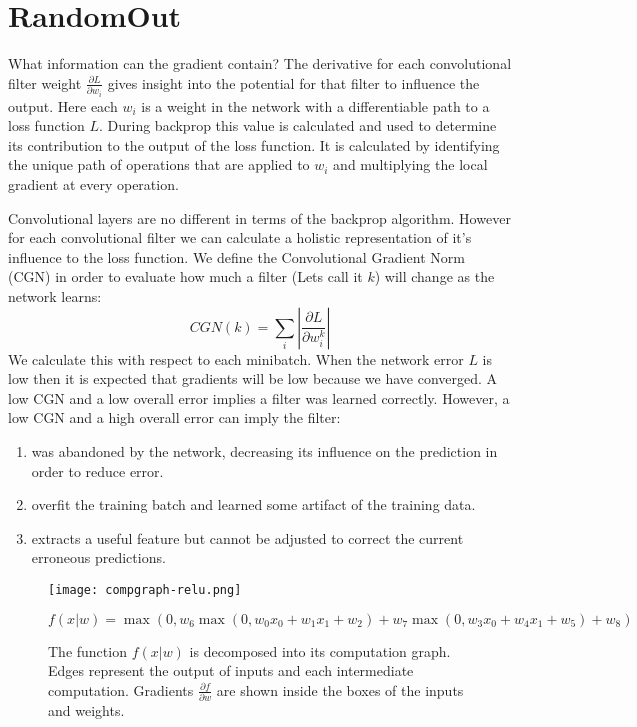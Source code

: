 \documentclass{article}
\begin{document}
\section{RandomOut}
\label{sec:ro}

	What information can the gradient contain? The derivative for each convolutional filter weight $\frac{\partial L}{\partial w_i}$ gives insight into the potential for that filter to influence the output. Here each $w_i$ is a weight in the network with a differentiable path to a loss function $L$. During backprop this value is calculated and used to determine its contribution to the output of the loss function. It is calculated by identifying the unique path of operations that are applied to $w_i$ and multiplying the local gradient at every operation. 
	
	Convolutional layers are no different in terms of the backprop algorithm. However for each convolutional filter we can calculate a holistic representation of it's influence to the loss function. We define the Convolutional Gradient Norm (CGN) in order to evaluate how much a filter (Lets call it $k$) will change as the network learns:
$$CGN(k) = \sum_{i} \left|\frac{\partial L}{\partial w^k_i}\right|$$%
We calculate this with respect to each minibatch. When the network error $L$ is low then it is expected that gradients will be low because we have converged. A low CGN and a low overall error implies a filter was learned correctly. However, a low CGN and a high overall error can imply the filter: 


\vspace{-10pt}
\begin{enumerate}
  \item was abandoned by the network, decreasing its influence on the prediction in order to reduce error.
  \item overfit the training batch and learned some artifact of the training data. 
  \item extracts a useful feature but cannot be adjusted to correct the current erroneous predictions.
\end{enumerate}
	
	
	
\begin{figure*}
  \begin{center}
    \texttt{[image: compgraph-relu.png]}
    
    $f(x|w) = \max(0, w_6 \max(0,w_0x_0 + w_1x_1 + w_2) +  w_7 \max(0,w_3x_0 + w_4x_1 + w_5) + w_8)$
     \caption{The function $f(x|w)$ is decomposed into its computation graph. Edges represent the output of inputs and each intermediate computation. Gradients $\frac{\partial f}{\partial w}$ are shown inside the boxes of the inputs and weights.}
      \label{fig:compgraph-relu}
  \end{center}
\end{figure*}
	
\end{document}
